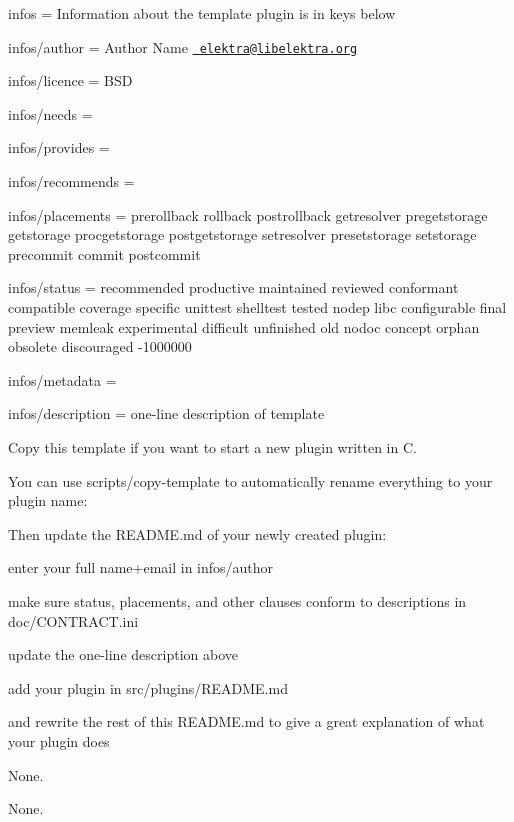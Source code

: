 
\begin{DoxyItemize}
\item infos = Information about the template plugin is in keys below
\item infos/author = Author Name \href{mailto:elektra@libelektra.org}{\texttt{ elektra@libelektra.\+org}}
\item infos/licence = B\+SD
\item infos/needs =
\item infos/provides =
\item infos/recommends =
\item infos/placements = prerollback rollback postrollback getresolver pregetstorage getstorage procgetstorage postgetstorage setresolver presetstorage setstorage precommit commit postcommit
\item infos/status = recommended productive maintained reviewed conformant compatible coverage specific unittest shelltest tested nodep libc configurable final preview memleak experimental difficult unfinished old nodoc concept orphan obsolete discouraged -\/1000000
\item infos/metadata =
\item infos/description = one-\/line description of template
\end{DoxyItemize}

Copy this template if you want to start a new plugin written in C.

You can use {\ttfamily scripts/copy-\/template} to automatically rename everything to your plugin name\+:


\begin{DoxyCode}{0}
\end{DoxyCode}


Then update the R\+E\+A\+D\+M\+E.\+md of your newly created plugin\+:


\begin{DoxyItemize}
\item enter your full name+email in {\ttfamily infos/author}
\item make sure {\ttfamily status}, {\ttfamily placements}, and other clauses conform to descriptions in {\ttfamily doc/\+C\+O\+N\+T\+R\+A\+C\+T.\+ini}
\item update the one-\/line description above
\item add your plugin in {\ttfamily src/plugins/\+R\+E\+A\+D\+M\+E.\+md}
\item and rewrite the rest of this {\ttfamily R\+E\+A\+D\+M\+E.\+md} to give a great explanation of what your plugin does
\end{DoxyItemize}

None.


\begin{DoxyCode}{0}
\DoxyCodeLine{}
\DoxyCodeLine{}
\end{DoxyCode}


None. 